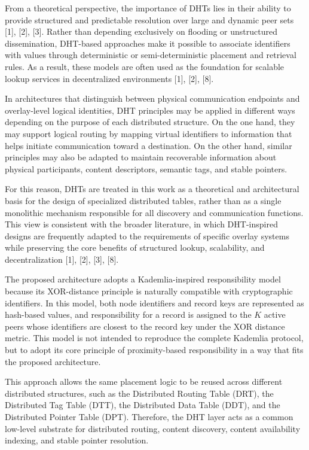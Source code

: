 \documentclass[12pt]{article}
\begin{document}
From a theoretical perspective, the importance of DHTs lies in their ability to
provide structured and predictable resolution over large and dynamic peer sets
[1], [2], [3]. Rather than depending exclusively on flooding or unstructured
dissemination, DHT-based approaches make it possible to associate identifiers with
values through deterministic or semi-deterministic placement and retrieval rules.
As a result, these models are often used as the foundation for scalable lookup
services in decentralized environments [1], [2], [8].

In architectures that distinguish between physical communication endpoints and
overlay-level logical identities, DHT principles may be applied in different ways
depending on the purpose of each distributed structure. On the one hand, they may
support logical routing by mapping virtual identifiers to information that helps
initiate communication toward a destination. On the other hand, similar principles
may also be adapted to maintain recoverable information about physical
participants, content descriptors, semantic tags, and stable pointers.

For this reason, DHTs are treated in this work as a theoretical and architectural
basis for the design of specialized distributed tables, rather than as a single
monolithic mechanism responsible for all discovery and communication functions.
This view is consistent with the broader literature, in which DHT-inspired designs
are frequently adapted to the requirements of specific overlay systems while
preserving the core benefits of structured lookup, scalability, and decentralization
[1], [2], [3], [8].

The proposed architecture adopts a Kademlia-inspired responsibility model because
its XOR-distance principle is naturally compatible with cryptographic identifiers.
In this model, both node identifiers and record keys are represented as hash-based
values, and responsibility for a record is assigned to the \(K\) active peers whose
identifiers are closest to the record key under the XOR distance metric. This model
is not intended to reproduce the complete Kademlia protocol, but to adopt its core
principle of proximity-based responsibility in a way that fits the proposed
architecture.

This approach allows the same placement logic to be reused across different
distributed structures, such as the Distributed Routing Table (DRT), the
Distributed Tag Table (DTT), the Distributed Data Table (DDT), and the Distributed
Pointer Table (DPT). Therefore, the DHT layer acts as a common low-level substrate
for distributed routing, content discovery, content availability indexing, and
stable pointer resolution.
\end{document}
